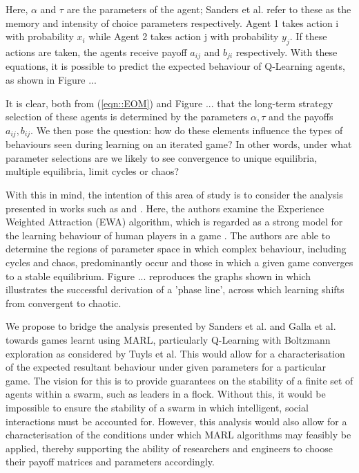 \documentclass[.../main.tex]{subfiles}
\begin{document}
	Here, $\alpha$ and $\tau$ are the parameters of the agent; Sanders et al. refer to these as the
	memory and intensity of choice parameters respectively. Agent 1 takes action i with probability
	$x_i$ while Agent 2 takes action j with probability $y_j$. If these actions are taken, the agents
	receive payoff $a_{ij}$ and $b_{ji}$ respectively. With these equations, it is possible to
	predict the expected behaviour of Q-Learning agents, as shown in Figure ...

	It is clear, both from (\ref{eqn::EOM}) and Figure ... that the long-term strategy selection of
	these agents is determined by the parameters $\alpha, \tau$ and the payoffs $a_{ij}, b_{ij}$. We
	then pose the question: how do these elements influence the types of behaviours seen during
	learning on an iterated game? In other words, under what parameter selections are we likely to
	see convergence to unique equilibria, multiple equilibria, limit cycles or chaos?

	With this in mind, the intention of this area of study is to consider the analysis presented in
	works such as \cite{Sanders2018} and \cite{Galla2011}. Here, the authors examine the
	Experience Weighted Attraction (EWA) algorithm, which is regarded as a strong model for the
	learning behaviour of human players in a game \cite{whatevertheycite}. The authors are able to
	determine the regions of parameter space in which complex behaviour,
	including cycles and chaos, predominantly occur and those in which a given game converges to a
	stable equilibrium. Figure ... reproduces the graphs shown in \cite{Sanders2018} which
	illustrates the successful derivation of a 'phase line', across which learning shifts from
	convergent to chaotic.

    We propose to bridge the analysis presented by Sanders
    et al. and Galla et al. towards games learnt using MARL, particularly Q-Learning with
    Boltzmann exploration as considered by Tuyls et al. This would allow for a characterisation of
    the expected resultant behaviour under given parameters for a particular game. The vision for
    this is to provide guarantees on the stability of a finite set of agents within a swarm, such as
    leaders in a flock. Without this, it would be impossible to ensure the stability of a swarm in
    which intelligent, social interactions must be accounted for. However, this analysis
    would also allow for a characterisation of the conditions under which MARL algorithms may
    feasibly be applied, thereby supporting the ability of researchers and engineers to choose their
    payoff matrices and parameters accordingly.
\end{document}
